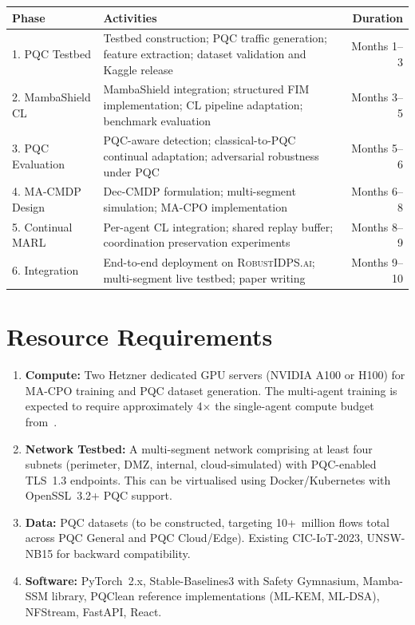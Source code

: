 \documentclass[12pt,a4paper]{article}
\newcommand{\RobustIDPS}{\textsc{RobustIDPS.ai}}
\theoremstyle{definition}
\begin{document}
\begin{table}[h]
\centering
\begin{tabularx}{\textwidth}{lXr}
\toprule
\textbf{Phase} & \textbf{Activities} & \textbf{Duration} \\
\midrule
1. PQC Testbed & Testbed construction; PQC traffic generation; feature extraction; dataset validation and Kaggle release & Months 1--3 \\
2. MambaShield CL & MambaShield integration; structured FIM implementation; CL pipeline adaptation; benchmark evaluation & Months 3--5 \\
3. PQC Evaluation & PQC-aware detection; classical-to-PQC continual adaptation; adversarial robustness under PQC & Months 5--6 \\
4. MA-CMDP Design & Dec-CMDP formulation; multi-segment simulation; MA-CPO implementation & Months 6--8 \\
5. Continual MARL & Per-agent CL integration; shared replay buffer; coordination preservation experiments & Months 8--9 \\
6. Integration & End-to-end deployment on \RobustIDPS{}; multi-segment live testbed; paper writing & Months 9--10 \\
\bottomrule
\end{tabularx}
\end{table}

\section{Resource Requirements}
\label{sec:resources}

\begin{enumerate}
\item \textbf{Compute:} Two Hetzner dedicated GPU servers (NVIDIA A100 or H100) for MA-CPO training and PQC dataset generation. The multi-agent training is expected to require approximately 4$\times$ the single-agent compute budget from~\cite{anaedevha2026cl_rl}.

\item \textbf{Network Testbed:} A multi-segment network comprising at least four subnets (perimeter, DMZ, internal, cloud-simulated) with PQC-enabled TLS~1.3 endpoints. This can be virtualised using Docker/Kubernetes with OpenSSL~3.2+ PQC support.

\item \textbf{Data:} PQC datasets (to be constructed, targeting 10+~million flows total across PQC General and PQC Cloud/Edge). Existing CIC-IoT-2023, UNSW-NB15 for backward compatibility.

\item \textbf{Software:} PyTorch~2.x, Stable-Baselines3 with Safety Gymnasium, Mamba-SSM library, PQClean reference implementations (ML-KEM, ML-DSA), NFStream, FastAPI, React.
\end{enumerate}
\end{document}
